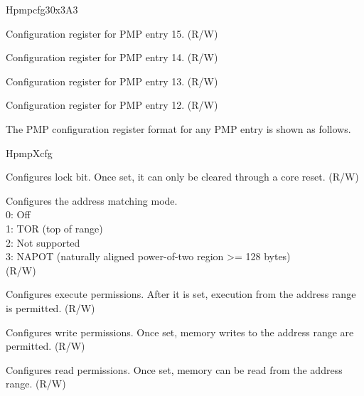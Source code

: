 \begin{register}{H}{pmpcfg3}{0x3A3}
\label{regdesc:lppmpcfg3}%
%
%
%
%
\regnewline%
\begin{regdesc}
\begin{reglist}
\label{fielddesc:lppmp15cfg}\item [pmp15cfg] Configuration register for PMP entry 15. (R/W)
\label{fielddesc:lppmp14cfg}\item [pmp14cfg] Configuration register for PMP entry 14. (R/W)
\label{fielddesc:lppmp13cfg}\item [pmp13cfg] Configuration register for PMP entry 13. (R/W)
\label{fielddesc:lppmp12cfg}\item [pmp12cfg] Configuration register for PMP entry 12. (R/W)
\end{reglist}
\end{regdesc}
\end{register}

The PMP configuration register format for any PMP entry is shown as follows.

\begin{register}{H}{pmpXcfg}{}
\label{regdesc:lppmpXcfg}%
%
%
%
%
%
%
\regnewline%
\begin{regdesc}
\begin{reglist}
\label{fielddesc:LPPMPXCFGL}\item [L] Configures lock bit. Once set, it can only be cleared through a core reset. (R/W)
\label{fielddesc:LPPMPXCFGA}\item [A] Configures the address matching mode. \\
0: Off \\
1: TOR (top of range)\\
2: Not supported \\
3: NAPOT (naturally aligned power-of-two region >= 128 bytes)\\
(R/W)
\label{fielddesc:LPPMPXCFGX}\item [X] Configures execute permissions. After it is set, execution from the address range is permitted. (R/W)
\label{fielddesc:LPPMPXCFGW}\item [W] Configures write permissions. Once set, memory writes to the address range are permitted. (R/W)
\label{fielddesc:LPPMPXCFGR}\item [R] Configures read permissions. Once set, memory can be read from the address range. (R/W)
\end{reglist}
\end{regdesc}
\end{register}

